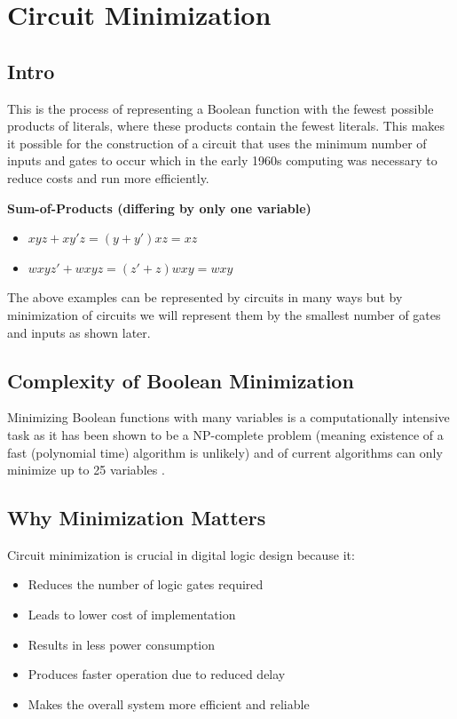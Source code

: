\section{Circuit Minimization}

\subsection{Intro}
This is the process of representing a Boolean function with the fewest possible
products of literals, where these products contain the fewest literals. This 
makes it possible for the construction of a circuit that uses the minimum 
number of inputs and gates to occur which in the early 1960s computing was 
necessary to reduce costs and run more efficiently.

\bigskip
\noindent\textbf{Sum-of-Products (differing by only one variable)}

\begin{itemize}
    \item $xyz + xy'z = (y+y')xz = xz$
    \item $wxyz' + wxyz = (z'+z)wxy = wxy$
\end{itemize}

\bigskip
\noindent The above examples can be represented by circuits in many ways but by 
minimization of circuits we will represent them by the smallest number of 
gates and inputs as shown later.

\subsection{Complexity of Boolean Minimization}
Minimizing Boolean functions with many variables is a computationally intensive
task as it has been shown to be a NP-complete problem (meaning existence of a 
fast (polynomial time) algorithm is unlikely) and of current algorithms can only
minimize up to 25 variables \cite{shannon1938}.

\subsection{Why Minimization Matters}
Circuit minimization is crucial in digital logic design because it:
\begin{itemize}
    \item Reduces the number of logic gates required
    \item Leads to lower cost of implementation
    \item Results in less power consumption
    \item Produces faster operation due to reduced delay
    \item Makes the overall system more efficient and reliable
\end{itemize}

